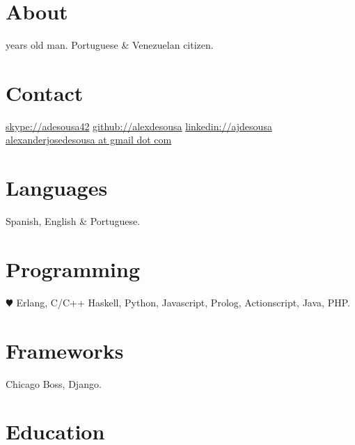 \documentclass[]{friggeri-cv} %
\newcommand{\myage}[3]{%
    \newcounter{age}
    \setcounter{age}{\the\year}
    \addtocounter{age}{-#1}
    \ifthenelse{\the\month < #2}{
        \addtocounter{age}{-1}
    }{
        \ifthenelse{\the\month = #2}{
            \ifthenelse{\the\day < #3}{
                \addtocounter{age}{-1}
            }{}
        }{}
    }
    \theage
}
\begin{document}


\begin{aside} %
\section{About}
\myage{1989}{01}{12} years old man.
Portuguese \& Venezuelan citizen.
\section{Contact}
\href{skype://adesousa42}{skype://adesousa42}
\href{http://github.com/alexdesousa}{github://alexdesousa}
\href{https://www.linkedin.com/in/ajdesousa}{linkedin://ajdesousa}
~
\href{mailto:alexanderjosedesousa@gmail.com}{alexanderjosedesousa at gmail dot
com}
\section{Languages}
Spanish, English \& Portuguese.
\section{Programming}
{\color{red} $\varheartsuit$} Erlang, C/C++
Haskell, Python, Javascript,
Prolog, Actionscript, Java, PHP.
\section{Frameworks}
Chicago Boss, Django.
\end{aside}


\section{Education}
\end{document}
